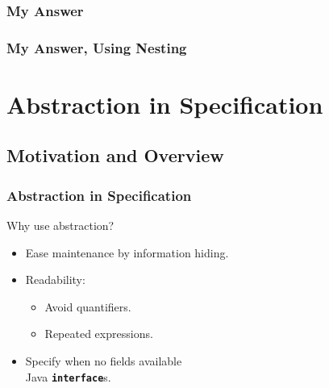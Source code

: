 \begin{frame}[fragile]
\frametitle{My Answer}

\end{frame}

\begin{frame}[fragile]
\frametitle{My Answer, Using Nesting}

\end{frame}



\section[Abstr.]{Abstraction in Specification}

\subsection[Motivation]{Motivation and Overview}

\begin{frame}
\frametitle{Abstraction in Specification}

Why use abstraction?
\begin{itemize}
\item
Ease maintenance by information hiding.

\item
Readability:
\begin{itemize}
\item
Avoid quantifiers.

\item
Repeated expressions.
\end{itemize}

\item
Specify when no fields available \\
Java \textbf{\texttt{interface}}s.
\end{itemize}
\end{frame}

